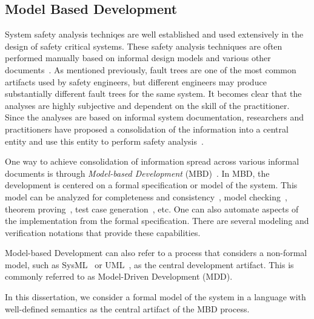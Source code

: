 \subsection{Model Based Development}
\label{sec:mbd}
System safety analysis techniqes are well established and used extensively in the design of safety critical systems. These safety analysis techniques are often performed manually based on informal design models and various other documents~\cite{schatz2002model,Joshi05:Dasc}. As mentioned previously, fault trees are one of the most common artifacts used by safety engineers, but different engineers may produce substantially different fault trees for the same system. It becomes clear that the analyses are highly subjective and dependent on the skill of the practitioner. Since the analyses are based on informal system documentation, researchers and practitioners have proposed a consolidation of the information into a central entity and use this entity to perform safety analysis~\cite{joshi2008behavioral, Joshi05:SafeComp, Joshi07:Hase, CAV2015:BoCiGrMa, Bozzano:2010:DSA:1951720, lisagor2011model}.

One way to achieve consolidation of information spread across various informal documents is through \emph{Model-based Development} (MBD)~\cite{schatz2002model}. In MBD, the development is centered on a formal specification or model of the system. This model can be analyzed for completeness and consistency~\cite{heimdahl1996completeness}, model checking~\cite{miller2010software,clarke2018model, grumberg1994model}, theorem proving~\cite{rayadurgam2003using}, test case generation~\cite{anand2013orchestrated,rayadurgam2001coverage}, etc. One can also automate aspects of the implementation from the formal specification. There are several modeling and verification notations that provide these capabilities. 

Model-based Development can also refer to a process that considers a non-formal model, such as SysML~\cite{friedenthal2014practical} or UML~\cite{fowler2003brief}, as the central development artifact. This is commonly referred to as Model-Driven Development (MDD). 

In this dissertation, we consider a formal model of the system in a language with well-defined semantics as the central artifact of the MBD process. 

